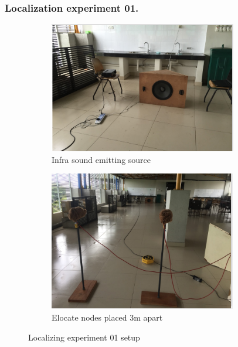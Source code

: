 \documentclass[12pt]{article}
\numberwithin{figure}{section}
\numberwithin{table}{section}
\begin{document}
\subsubsection{Localization experiment 01.}
\begin{figure}[H]
\centering
\begin{subfigure}{.5\textwidth}
  \centering
  \includegraphics[width=.8\linewidth]{localizing_exp1_1.png}
  \caption{Infra sound emitting source}
  \label{fig:sub1}
\end{subfigure}%
\begin{subfigure}{.5\textwidth}
  \centering
  \includegraphics[width=.8\linewidth]{localizing_exp1_2.png}
  \caption{Elocate nodes placed 3m apart}
  \label{fig:sub2}
\end{subfigure}
\caption{Localizing experiment 01 setup}
\label{fig:test}
\end{figure}
\end{document}
